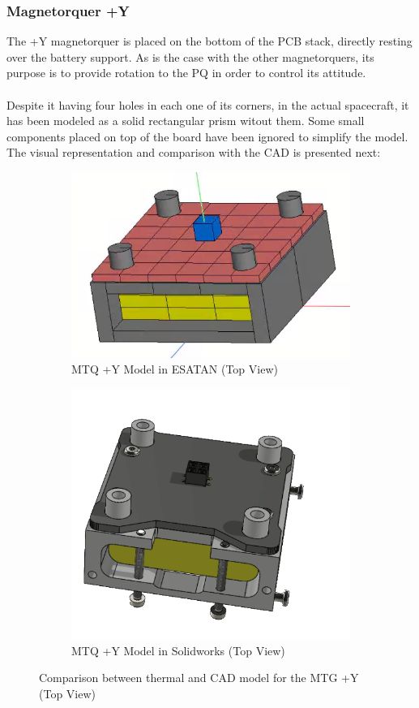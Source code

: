 \subsubsection{Magnetorquer +Y}

The +Y magnetorquer is placed on the bottom of the PCB stack, directly resting over the battery support. As is the case
with the other magnetorquers, its purpose is to provide rotation to the PQ in order to control its attitude.
\paragraph{}
Despite it having four holes in each one of its corners, in the actual spacecraft, it has been modeled as a solid rectangular
prism witout them. Some small components placed on top of the board have been ignored to simplify the model.
The visual representation and comparison with the CAD is presented next: 

\begin{figure}[H]
    \centering
    \begin{subfigure}{.5\textwidth}
      \centering
      \includegraphics[width=.5\linewidth]{res/img/5_simulationanalisys/Comparisons/ESATAN/MTQ.PNG}
      \caption{MTQ +Y Model in ESATAN (Top View)}
      \label{fig:mtq}
    \end{subfigure}%
    \begin{subfigure}{.5\textwidth}
      \centering
      \includegraphics[width=.5\linewidth]{res/img/5_simulationanalisys/Comparisons/SLDW/MTQ_Solid.PNG}
      \caption{MTQ +Y Model in Solidworks (Top View)}
      \label{fig:mtqsolid}
    \end{subfigure}
    \caption{Comparison between thermal and CAD model for the MTG +Y (Top View)}
    \label{fig:mtqim}
\end{figure}


